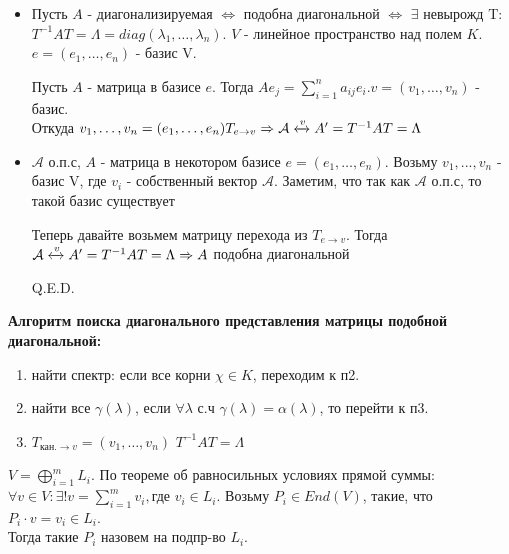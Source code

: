 \begin{itemize}
    \item  \fbox{\(\Rightarrow\)}

    Пусть $A$ - диагонализируемая $\Leftrightarrow$ подобна диагональной $\Leftrightarrow$ $\exists$ невырожд T: $T^{-1}AT=\Lambda=diag(\lambda_1,\ldots,\lambda_n)$. $V$ - линейное пространство над полем $K$. $e = (e_1,\ldots,e_n)$ - базис V.

    Пусть $A$ - матрица в базисе $e$. Тогда $Ae_j = \sum\limits_{i=1}^na_{ij}e_i$.$v =(v_1,\ldots,v_n)$ - базис.\\Откуда $v_1,\ldots,v_n = (e_1,\ldots,e_n)T_{e\rightarrow v} \Rightarrow \mathcal{A}\xleftrightarrow{v} A' = T^{-1}AT=\Lambda$
    \item \fbox{\(\Leftarrow\)}
    $\mathcal{A}$ о.п.с, $A$ - матрица в некотором базисе $e= (e_1,\ldots,e_n)$.
    Возьму $v_1, ..., v_n$ - базис V, где $v_i$ - собственный вектор $\mathcal{A}$. Заметим, что так как $\mathcal{A}$ о.п.с, то такой базис существует

   Теперь давайте возьмем матрицу перехода из $T_{e\rightarrow v}$. Тогда $\mathcal{A}\xleftrightarrow{v} A' = T^{-1}AT=\Lambda \Rightarrow A$ подобна диагональной

    \hfill Q.E.D.
\end{itemize}

\textbf{Алгоритм поиска диагонального представления матрицы подобной диагональной:}
\begin{enumerate}
    \item найти спектр: если все корни $\chi \in K $, переходим к п2.
    \item найти все $\gamma(\lambda)$, если $\forall \lambda$ с.ч $\gamma(\lambda) = \alpha(\lambda)$, то перейти к п3.
    \item $T_{\text{кан.}\rightarrow v} = (v_1,\ldots,v_n)$ $T^{-1}AT = \Lambda$
\end{enumerate}







 $V = \bigoplus\limits_{i=1}^mL_i$. По теореме об равносильных условиях прямой суммы:
\\$\forall v\in V: \exists! v = \sum\limits_{i=1}^mv_i, \text{где } v_i \in L_i$. Возьму $P_i \in  End(V)$,  такие, что $P_i \cdot v = v_i \in L_i$.\\ Тогда такие $P_i$ назовем  на подпр-во $L_i$.



